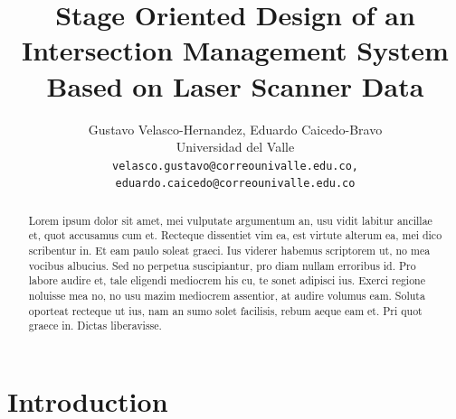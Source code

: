\documentclass[10pt,twocolumn,letterpaper]{article}
\begin{document}
\title{Stage Oriented Design of an Intersection Management System Based on Laser Scanner Data}

\author{Gustavo Velasco-Hernandez, Eduardo Caicedo-Bravo \\
Universidad del Valle\\
{\tt\small velasco.gustavo@correounivalle.edu.co, eduardo.caicedo@correounivalle.edu.co}
}

\maketitle

\begin{abstract}
Lorem ipsum dolor sit amet, mei vulputate argumentum an, usu vidit labitur ancillae et, quot accusamus cum et. Recteque dissentiet vim ea, est virtute alterum ea, mei dico scribentur in. Et eam paulo soleat graeci. Ius viderer habemus scriptorem ut, no mea vocibus albucius. Sed no perpetua suscipiantur, pro diam nullam erroribus id. Pro labore audire et, tale eligendi mediocrem his cu, te sonet adipisci ius. Exerci regione noluisse mea no, no usu mazim mediocrem assentior, at audire volumus eam. Soluta oporteat recteque ut ius, nam an sumo solet facilisis, rebum aeque eam et. Pri quot graece in. Dictas liberavisse.
\end{abstract}

\section{Introduction}
\end{document}
